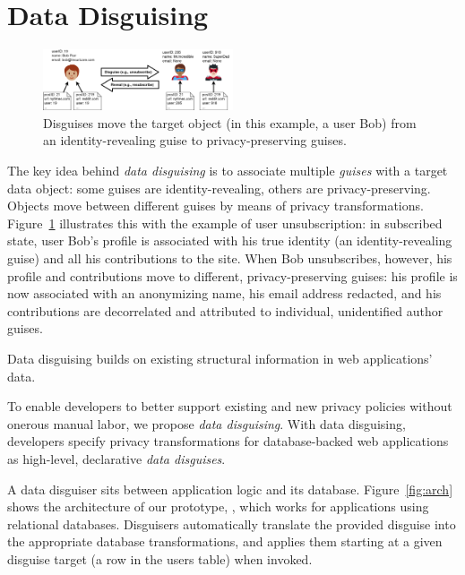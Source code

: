 \section{Data Disguising}
\begin{figure}[t!]
    \centering
    \includegraphics[width=0.5\textwidth]{img/disguises_design}

    \caption{Disguises move the target object (in this example, a user Bob) from an identity-revealing
    guise to privacy-preserving guises.}
    \label{fig:example}
\end{figure}

%
The key idea behind \emph{data disguising} is to associate multiple \emph{guises} with a target
data object: some guises are identity-revealing, others are privacy-preserving.
%
Objects move between different guises by means of privacy transformations.
%
Figure~\ref{fig:example} illustrates this with the example of user unsubscription: in subscribed
state, user Bob's profile is associated with his true identity (an identity-revealing guise)
and all his contributions to the site.
%
When Bob unsubscribes, however, his profile and contributions move to different,
privacy-preserving guises: his profile is now associated with an anonymizing name, his email
address redacted, and his contributions are decorrelated and attributed to individual,
unidentified author guises.
%

%
Data disguising builds on existing structural information in web applications' data.
%


%
To enable developers to better support existing and new privacy policies without onerous manual
labor, we propose \emph{data disguising}.
%
With data disguising, developers specify privacy transformations for database-backed web
applications as high-level, declarative \emph{data disguises}.

A data disguiser sits between application logic and its database. Figure~\ref{fig:arch} shows the
architecture of our prototype, \sys, which works for applications using relational databases.
Disguisers automatically translate the provided disguise into the appropriate database transformations, and
applies them starting at a given disguise target (\eg a row in the users table) when invoked.

